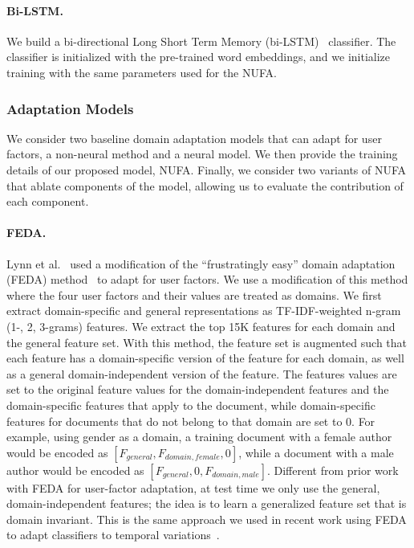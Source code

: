 \paragraph{Bi-LSTM.} We build a bi-directional Long Short Term Memory (bi-LSTM)~\cite{hochreiter1997long} classifier. The classifier is initialized with the pre-trained word embeddings, and we initialize training with the same parameters used for the NUFA.


\subsubsection{Adaptation Models}

We consider two baseline domain adaptation models that can adapt for user factors, a non-neural method and a neural model.
We then provide the training details of our proposed model, NUFA.
Finally, we consider two variants of NUFA that ablate components of the model, allowing us to evaluate the contribution of each component.

\paragraph{FEDA.} 
Lynn et al.~\cite{lynn2017human} used a modification of the ``frustratingly easy'' domain adaptation (FEDA) method~\cite{daume2007frustratingly} to adapt for user factors. 
We use a modification of this method where the four user factors and their values are treated as domains.
We first extract domain-specific and general representations as TF-IDF-weighted n-gram (1-, 2, 3-grams) features. We extract the top 15K features for each domain and the general feature set.
With this method, the feature set is augmented such that each feature has a domain-specific version of the feature for each domain, as well as a general domain-independent version of the feature.
The features values are set to the original feature values for the domain-independent features and the domain-specific features that apply to the document, while domain-specific features for documents that do not belong to that domain are set to $0$.
For example, using gender as a domain, a training document with a female author would be encoded as $[F_{general}, F_{domain, female}, 0]$, while a document with a male author would be encoded as $[F_{general}, 0, F_{domain, male}]$.
Different from prior work with FEDA for user-factor adaptation, 
at test time we only use the general, domain-independent features;
the idea is to learn a generalized feature set that is domain invariant.
This is the same approach we used in recent work using FEDA to adapt classifiers to temporal variations~\cite{huang2018examining}.




